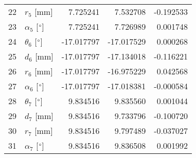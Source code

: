 \documentclass{standalone}%
\begin{document}
\begin{tabular}{llrrr}
22 &              $r_{5}$ [mm] &   7.725241 &   7.532708 &  -0.192533 \\
23 &  $\alpha_{5}$ [$\degree$] &   7.725241 &   7.726989 &   0.001748 \\
24 &  $\theta_{6}$ [$\degree$] & -17.017797 & -17.017529 &   0.000268 \\
25 &              $d_{6}$ [mm] & -17.017797 & -17.134018 &  -0.116221 \\
26 &              $r_{6}$ [mm] & -17.017797 & -16.975229 &   0.042568 \\
27 &  $\alpha_{6}$ [$\degree$] & -17.017797 & -17.018381 &  -0.000584 \\
28 &  $\theta_{7}$ [$\degree$] &   9.834516 &   9.835560 &   0.001044 \\
29 &              $d_{7}$ [mm] &   9.834516 &   9.733796 &  -0.100720 \\
30 &              $r_{7}$ [mm] &   9.834516 &   9.797489 &  -0.037027 \\
31 &  $\alpha_{7}$ [$\degree$] &   9.834516 &   9.836508 &   0.001992 \\
\bottomrule
\end{tabular}
%
\end{document}
